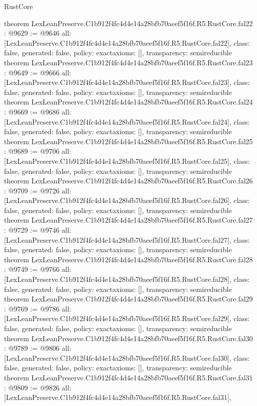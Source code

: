 \begin{lexlean}{RustCore}
\begin{coremodule}
{}
theorem LexLeanPreserve.C1b912f4fc4d4e14a28bfb70aeef5f16f.R5.RustCore.fal22 : @9629 := @9646 {
  all: [LexLeanPreserve.C1b912f4fc4d4e14a28bfb70aeef5f16f.R5.RustCore.fal22],
  class: false,
  generated: false,
  policy: exact{axioms: []},
  transparency: semireducible
}
theorem LexLeanPreserve.C1b912f4fc4d4e14a28bfb70aeef5f16f.R5.RustCore.fal23 : @9649 := @9666 {
  all: [LexLeanPreserve.C1b912f4fc4d4e14a28bfb70aeef5f16f.R5.RustCore.fal23],
  class: false,
  generated: false,
  policy: exact{axioms: []},
  transparency: semireducible
}
theorem LexLeanPreserve.C1b912f4fc4d4e14a28bfb70aeef5f16f.R5.RustCore.fal24 : @9669 := @9686 {
  all: [LexLeanPreserve.C1b912f4fc4d4e14a28bfb70aeef5f16f.R5.RustCore.fal24],
  class: false,
  generated: false,
  policy: exact{axioms: []},
  transparency: semireducible
}
theorem LexLeanPreserve.C1b912f4fc4d4e14a28bfb70aeef5f16f.R5.RustCore.fal25 : @9689 := @9706 {
  all: [LexLeanPreserve.C1b912f4fc4d4e14a28bfb70aeef5f16f.R5.RustCore.fal25],
  class: false,
  generated: false,
  policy: exact{axioms: []},
  transparency: semireducible
}
theorem LexLeanPreserve.C1b912f4fc4d4e14a28bfb70aeef5f16f.R5.RustCore.fal26 : @9709 := @9726 {
  all: [LexLeanPreserve.C1b912f4fc4d4e14a28bfb70aeef5f16f.R5.RustCore.fal26],
  class: false,
  generated: false,
  policy: exact{axioms: []},
  transparency: semireducible
}
theorem LexLeanPreserve.C1b912f4fc4d4e14a28bfb70aeef5f16f.R5.RustCore.fal27 : @9729 := @9746 {
  all: [LexLeanPreserve.C1b912f4fc4d4e14a28bfb70aeef5f16f.R5.RustCore.fal27],
  class: false,
  generated: false,
  policy: exact{axioms: []},
  transparency: semireducible
}
theorem LexLeanPreserve.C1b912f4fc4d4e14a28bfb70aeef5f16f.R5.RustCore.fal28 : @9749 := @9766 {
  all: [LexLeanPreserve.C1b912f4fc4d4e14a28bfb70aeef5f16f.R5.RustCore.fal28],
  class: false,
  generated: false,
  policy: exact{axioms: []},
  transparency: semireducible
}
theorem LexLeanPreserve.C1b912f4fc4d4e14a28bfb70aeef5f16f.R5.RustCore.fal29 : @9769 := @9786 {
  all: [LexLeanPreserve.C1b912f4fc4d4e14a28bfb70aeef5f16f.R5.RustCore.fal29],
  class: false,
  generated: false,
  policy: exact{axioms: []},
  transparency: semireducible
}
theorem LexLeanPreserve.C1b912f4fc4d4e14a28bfb70aeef5f16f.R5.RustCore.fal30 : @9789 := @9806 {
  all: [LexLeanPreserve.C1b912f4fc4d4e14a28bfb70aeef5f16f.R5.RustCore.fal30],
  class: false,
  generated: false,
  policy: exact{axioms: []},
  transparency: semireducible
}
theorem LexLeanPreserve.C1b912f4fc4d4e14a28bfb70aeef5f16f.R5.RustCore.fal31 : @9809 := @9826 {
  all: [LexLeanPreserve.C1b912f4fc4d4e14a28bfb70aeef5f16f.R5.RustCore.fal31],
}
\end{coremodule}
\end{lexlean}
